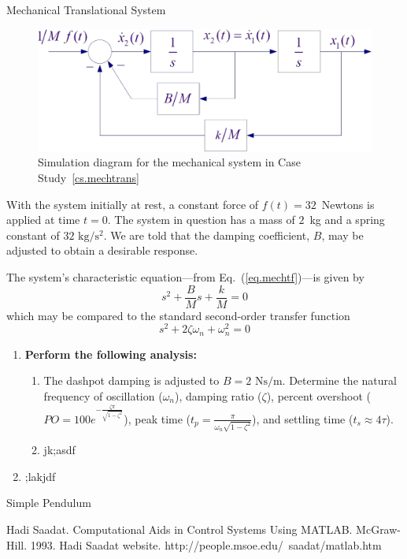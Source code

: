 \begin{casestudy}{Mechanical Translational System}
\begin{figure}[bht]
\centering
\includegraphics[width=.6\textwidth]{mechsimdiagram}
\caption{\footnotesize
        Simulation diagram for the mechanical system in Case Study~\ref{cs.mechtrans}
        \label{fig.mechsimdiagram}
        }
\end{figure}

With the system initially at rest, a constant force of $f(t) = 32$~Newtons is applied at time $t=0$.  The system in question has a mass of $2$~kg and a spring constant of $32\mbox{ kg}/\mbox{s}^2$.  We are told that the damping coefficient, $B$, may be adjusted to obtain a desirable response.
\par
The system's characteristic equation---from Eq.\ (\ref{eq.mechtf})---is given by
\begin{equation}
    s^2 + \frac{B}{M} s + \frac{k}{M} = 0
\end{equation}
which may be compared to the standard second-order transfer function
\begin{equation}
    s^2 + 2 \zeta \omega_n + \omega_n^2 = 0
\end{equation}

\begin{enumerate}
\item
    \textbf{Perform the following analysis:}
    \begin{enumerate}
    \item
        The dashpot damping is adjusted to $B = 2\mbox{ Ns/m}$.  Determine the natural frequency of oscillation ($\omega_n$), damping ratio ($\zeta$), percent overshoot ($PO = 100e^{-\frac{\zeta\pi}{\sqrt{1-\zeta^2}}}$), peak time ($t_p = \frac{\pi}{\omega_n \sqrt{1-\zeta^2}}$), and settling time ($t_s \approx 4\tau$).
    \item
        jk;asdf
    \end{enumerate}
\item
    ;lakjdf
\end{enumerate}

\end{casestudy}
\begin{casestudy}{
Simple Pendulum}
\label{cs.simplepend}

\end{casestudy}


\begin{thebibliography}{9}
     Hadi Saadat.  Computational Aids in Control Systems Using MATLAB.  McGraw-Hill.  1993.
     Hadi Saadat website. http://people.msoe.edu/~saadat/matlab.htm
\end{thebibliography}

